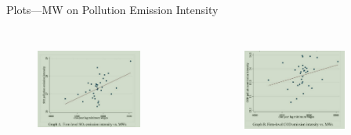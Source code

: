 \documentclass[aspectratio = 169]{beamer}
\begin{document}
    \begin{frame}{Plots---MW on Pollution Emission Intensity}
        \begin{columns}
            \begin{figure}
                \centering
                \includegraphics[width = 0.8\textwidth, height = 0.6\textheight]{climate_change/beamer/so2}
                \label{fig:so2-mw}
            \end{figure}

            \begin{figure}
                \centering
                \includegraphics[width = 0.8\textwidth, height = 0.6\textheight]{climate_change/beamer/cod}
                \label{fig:cod-mw}
            \end{figure}
        \end{columns}
    \end{frame}
\end{document}
